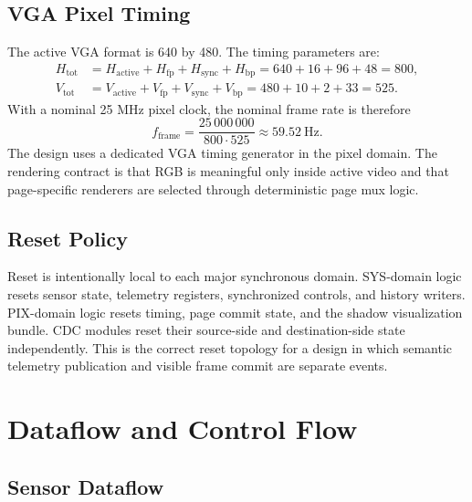 \documentclass[11pt]{article}
\begin{document}
\subsection{VGA Pixel Timing}

The active VGA format is 640 by 480.  The timing parameters are:
\begin{equation}
\begin{aligned}
H_{\mathrm{tot}} &= H_{\mathrm{active}} + H_{\mathrm{fp}} + H_{\mathrm{sync}} + H_{\mathrm{bp}}
                 = 640 + 16 + 96 + 48 = 800,\\
V_{\mathrm{tot}} &= V_{\mathrm{active}} + V_{\mathrm{fp}} + V_{\mathrm{sync}} + V_{\mathrm{bp}}
                 = 480 + 10 + 2 + 33 = 525.
\end{aligned}
\label{eq:vga-totals}
\end{equation}
With a nominal 25 MHz pixel clock, the nominal frame rate is therefore
\begin{equation}
    f_{\mathrm{frame}} =
    \frac{25\,000\,000}{800\cdot525}
    \approx 59.52~\mathrm{Hz}.
    \label{eq:vga-frame}
\end{equation}
The design uses a dedicated VGA timing generator in the pixel domain.  The
rendering contract is that RGB is meaningful only inside active video and that
page-specific renderers are selected through deterministic page mux logic.

\subsection{Reset Policy}

Reset is intentionally local to each major synchronous domain.  SYS-domain
logic resets sensor state, telemetry registers, synchronized controls, and
history writers.  PIX-domain logic resets timing, page commit state, and the
shadow visualization bundle.  CDC modules reset their source-side and
destination-side state independently.  This is the correct reset topology for a
design in which semantic telemetry publication and visible frame commit are
separate events.

\section{Dataflow and Control Flow}
\label{sec:dataflow}

\subsection{Sensor Dataflow}
\end{document}

